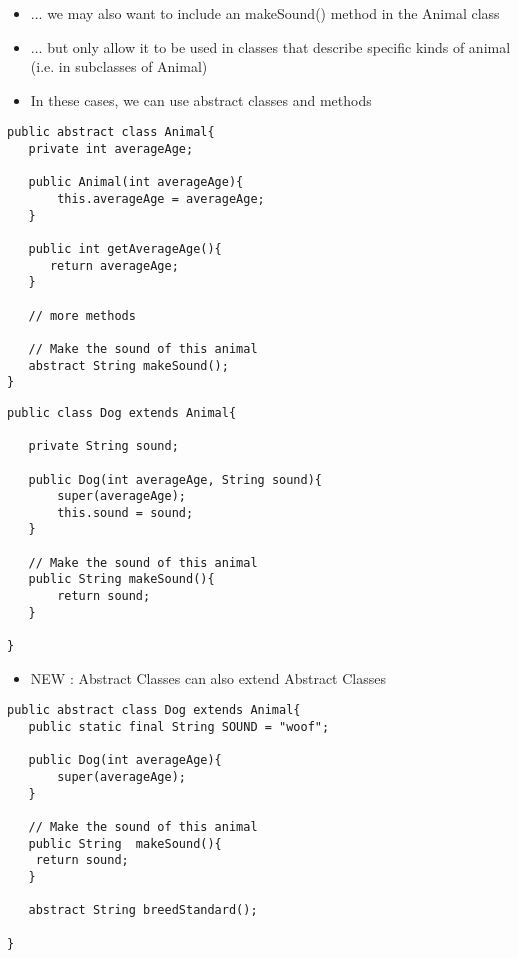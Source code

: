 \documentclass{beamer}
\begin{document}
\begin{frame}[fragile]
\begin{itemize}
\item ... we may also want to include an makeSound() method in the Animal class 
\item ... but only allow it to be used in classes that describe specific kinds of animal (i.e. in subclasses of Animal)
\bigskip
\item In these cases, we can use abstract classes and methods
\end{itemize}
\end{frame}

\begin{frame}[fragile]
\begin{block}{}
\begin{lstlisting}
public abstract class Animal{
   private int averageAge;
   
   public Animal(int averageAge){
       this.averageAge = averageAge;
   }

   public int getAverageAge(){
      return averageAge;
   }
   
   // more methods 
   
   // Make the sound of this animal
   abstract String makeSound();  
}
\end{lstlisting}
\end{block}
\end{frame}

\begin{frame}[fragile]
\begin{block}{}
\begin{lstlisting}
public class Dog extends Animal{

   private String sound;
   
   public Dog(int averageAge, String sound){
       super(averageAge);
       this.sound = sound;
   }
   
   // Make the sound of this animal
   public String makeSound(){
       return sound;
   }  
   
}
\end{lstlisting}
\end{block}
\end{frame}

\begin{frame}[fragile]
\begin{itemize}
\item NEW : Abstract Classes can also extend Abstract Classes
\end{itemize}
\begin{block}{}
\begin{lstlisting}
public abstract class Dog extends Animal{
   public static final String SOUND = "woof";
   
   public Dog(int averageAge){
       super(averageAge);
   }
   
   // Make the sound of this animal
   public String  makeSound(){
   	return sound;
   }
   
   abstract String breedStandard();
   
}
\end{lstlisting}
\end{block}
\end{frame}
\end{document}
